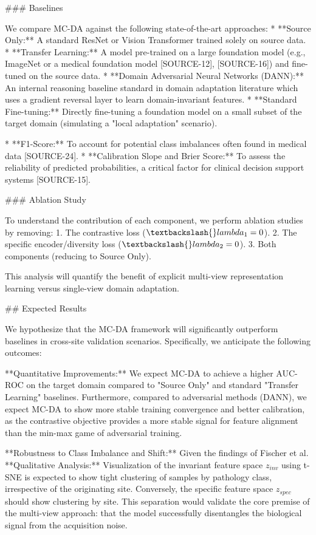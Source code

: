 \documentclass{article}
\begin{document}
\#\#\# Baselines

We compare MC-DA against the following state-of-the-art approaches:
* **Source Only:** A standard ResNet or Vision Transformer trained solely on source data.
* **Transfer Learning:** A model pre-trained on a large foundation model (e.g., ImageNet or a medical foundation model [SOURCE-12], [SOURCE-16]) and fine-tuned on the source data.
* **Domain Adversarial Neural Networks (DANN):** An internal reasoning baseline standard in domain adaptation literature which uses a gradient reversal layer to learn domain-invariant features.
* **Standard Fine-tuning:** Directly fine-tuning a foundation model on a small subset of the target domain (simulating a "local adaptation" scenario).

* **F1-Score:** To account for potential class imbalances often found in medical data [SOURCE-24].
* **Calibration Slope and Brier Score:** To assess the reliability of predicted probabilities, a critical factor for clinical decision support systems [SOURCE-15].

\#\#\# Ablation Study

To understand the contribution of each component, we perform ablation studies by removing:
1.  The contrastive loss ($\textbackslash{}lambda_1 = 0$).
2.  The specific encoder/diversity loss ($\textbackslash{}lambda_2 = 0$).
3.  Both components (reducing to Source Only).

This analysis will quantify the benefit of explicit multi-view representation learning versus single-view domain adaptation.

\#\# Expected Results

We hypothesize that the MC-DA framework will significantly outperform baselines in cross-site validation scenarios. Specifically, we anticipate the following outcomes:

**Quantitative Improvements:**
We expect MC-DA to achieve a higher AUC-ROC on the target domain compared to "Source Only" and standard "Transfer Learning" baselines.  Furthermore, compared to adversarial methods (DANN), we expect MC-DA to show more stable training convergence and better calibration, as the contrastive objective provides a more stable signal for feature alignment than the min-max game of adversarial training.

**Robustness to Class Imbalance and Shift:**
Given the findings of Fischer et al. **Qualitative Analysis:**
Visualization of the invariant feature space $z_{inv}$ using t-SNE is expected to show tight clustering of samples by pathology class, irrespective of the originating site. Conversely, the specific feature space $z_{spec}$ should show clustering by site. This separation would validate the core premise of the multi-view approach: that the model successfully disentangles the biological signal from the acquisition noise.
\end{document}
